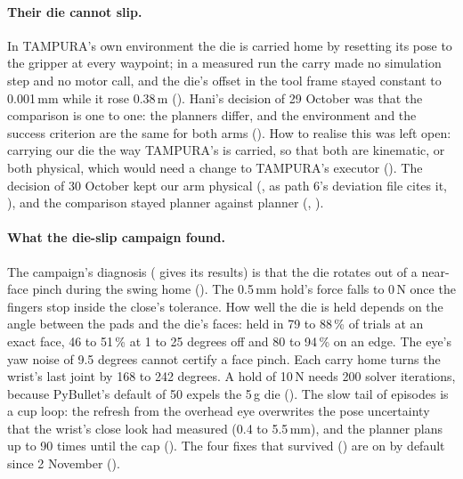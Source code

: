 \paragraph{Their die cannot slip.} In TAMPURA's own environment the die is carried
home by resetting its pose to the gripper at every waypoint; in a measured run the
carry made no simulation step and no motor call, and the die's offset in the tool
frame stayed constant to 0.001\,mm while it rose 0.38\,m (). Hani's decision
of 29 October was that the comparison is one to one: the planners differ, and
the environment and the success criterion are the same for both arms ().
How to realise this was left open: carrying our die the way TAMPURA's is carried, so
that both are kinematic, or both physical, which would need a change to TAMPURA's
executor (). The decision of 30 October kept our arm physical (, as path 6's
deviation file cites it, ), and the comparison stayed planner against
planner (, ).

\paragraph{What the die-slip campaign found.} The campaign's diagnosis
( gives its results) is that the die rotates out of a
near-face pinch during the swing home (). The 0.5\,mm hold's force falls to
0\,N once the fingers stop inside the close's tolerance. How well the die is held
depends on the angle between the pads and the die's faces: held in 79 to 88\,\% of
trials at an exact face, 46 to 51\,\% at 1 to 25 degrees off and 80 to 94\,\% on an
edge. The eye's yaw noise of 9.5 degrees cannot certify a face pinch. Each carry
home turns the wrist's last joint by 168 to 242 degrees. A hold of 10\,N needs 200
solver iterations, because PyBullet's default of 50 expels the 5\,g die ().
The slow tail of episodes is a cup loop: the refresh from the overhead eye
overwrites the pose uncertainty that the wrist's close look had measured (0.4 to
5.5\,mm), and the planner plans up to 90 times until the cap (). The four
fixes that survived () are on by default since 2 November ().

